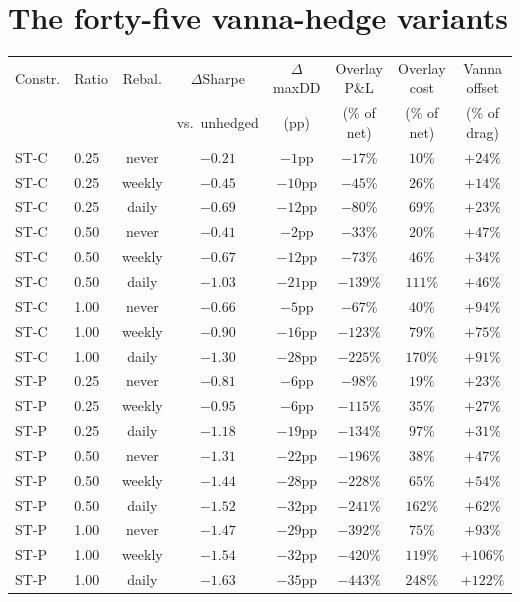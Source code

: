 \documentclass[11pt]{article}
\begin{document}
\section{The forty-five vanna-hedge variants}
\begin{table}[h]\centering\footnotesize\setlength{\tabcolsep}{4pt}
\begin{tabular}{llcccccc}\toprule
Constr. & Ratio & Rebal. & $\Delta$Sharpe & $\Delta$maxDD & Overlay P\&L & Overlay cost & Vanna offset \\
& & & vs.\ unhedged & (pp) & (\% of net) & (\% of net) & (\% of drag) \\ \midrule
ST-C & 0.25 & never & $-0.21$ & $-1$pp & $-17\%$ & $10\%$ & $+24\%$ \\
ST-C & 0.25 & weekly & $-0.45$ & $-10$pp & $-45\%$ & $26\%$ & $+14\%$ \\
ST-C & 0.25 & daily & $-0.69$ & $-12$pp & $-80\%$ & $69\%$ & $+23\%$ \\
ST-C & 0.50 & never & $-0.41$ & $-2$pp & $-33\%$ & $20\%$ & $+47\%$ \\
ST-C & 0.50 & weekly & $-0.67$ & $-12$pp & $-73\%$ & $46\%$ & $+34\%$ \\
ST-C & 0.50 & daily & $-1.03$ & $-21$pp & $-139\%$ & $111\%$ & $+46\%$ \\
ST-C & 1.00 & never & $-0.66$ & $-5$pp & $-67\%$ & $40\%$ & $+94\%$ \\
ST-C & 1.00 & weekly & $-0.90$ & $-16$pp & $-123\%$ & $79\%$ & $+75\%$ \\
ST-C & 1.00 & daily & $-1.30$ & $-28$pp & $-225\%$ & $170\%$ & $+91\%$ \\
ST-P & 0.25 & never & $-0.81$ & $-6$pp & $-98\%$ & $19\%$ & $+23\%$ \\
ST-P & 0.25 & weekly & $-0.95$ & $-6$pp & $-115\%$ & $35\%$ & $+27\%$ \\
ST-P & 0.25 & daily & $-1.18$ & $-19$pp & $-134\%$ & $97\%$ & $+31\%$ \\
ST-P & 0.50 & never & $-1.31$ & $-22$pp & $-196\%$ & $38\%$ & $+47\%$ \\
ST-P & 0.50 & weekly & $-1.44$ & $-28$pp & $-228\%$ & $65\%$ & $+54\%$ \\
ST-P & 0.50 & daily & $-1.52$ & $-32$pp & $-241\%$ & $162\%$ & $+62\%$ \\
ST-P & 1.00 & never & $-1.47$ & $-29$pp & $-392\%$ & $75\%$ & $+93\%$ \\
ST-P & 1.00 & weekly & $-1.54$ & $-32$pp & $-420\%$ & $119\%$ & $+106\%$ \\
ST-P & 1.00 & daily & $-1.63$ & $-35$pp & $-443\%$ & $248\%$ & $+122\%$ \\

\end{tabular}
\end{table}
\end{document}
